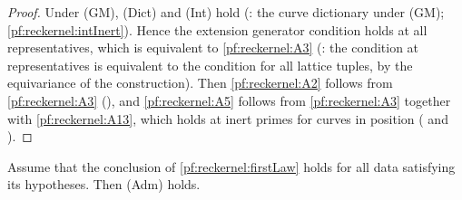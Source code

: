 \begin{proof}
Under \textup{(GM)}, (Dict) and (Int) hold (: the curve
dictionary under (GM); \cref{pf:reckernel:intInert}). Hence the extension generator condition holds at all
representatives, which is equivalent to \ref{pf:reckernel:A3}
(: the condition at
representatives is equivalent to the condition for all lattice tuples, by the equivariance of the construction).
Then \ref{pf:reckernel:A2} follows from \ref{pf:reckernel:A3}
(), and \ref{pf:reckernel:A5} follows from
\ref{pf:reckernel:A3} together with \ref{pf:reckernel:A13}, which holds at inert primes for curves in position
( and ).
\end{proof}

\begin{theorem}\label{pf:reckernel:admLaw}
Assume that the conclusion of \cref{pf:reckernel:firstLaw} holds for all data satisfying its hypotheses. Then
\textup{(Adm)} holds.
\end{theorem}

